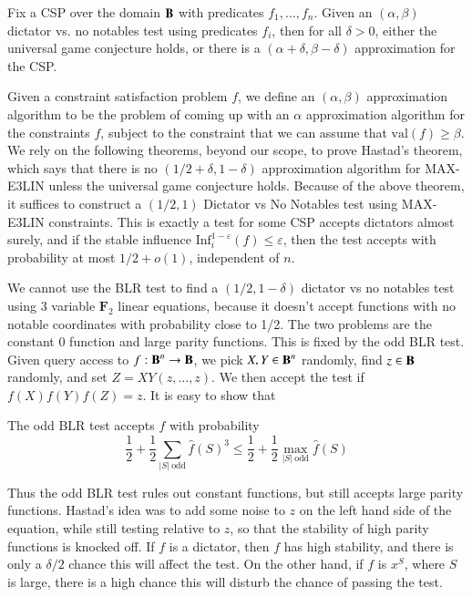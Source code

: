 \begin{theorem}
    Fix a CSP over the domain $\operatorname{\mathbf{B}}$ with predicates $f_1, \dots, f_n$. Given an $(\alpha, \beta)$ dictator vs. no notables test using predicates $f_i$, then for all $\delta > 0$, either the universal game conjecture holds, or there is a $(\alpha + \delta, \beta - \delta)$ approximation for the CSP.
\end{theorem}

Given a constraint satisfaction problem $f$, we define an $(\alpha, \beta)$ approximation algorithm to be the problem of coming up with an $\alpha$ approximation algorithm for the constraints $f$, subject to the constraint that we can assume that $\text{val}(f) \geq \beta$. We rely on the following theorems, beyond our scope, to prove Hastad's theorem, which says that there is no $(1/2 + \delta, 1 - \delta)$ approximation algorithm for MAX-E3LIN unless the universal game conjecture holds. Because of the above theorem, it suffices to construct a $(1/2,1)$ Dictator vs No Notables test using MAX-E3LIN constraints. This is exactly a test for some CSP accepts dictators almost surely, and if the stable influence $\text{Inf}_i^{1-\varepsilon}(f) \leq \varepsilon$, then the test accepts with probability at most $1/2 + o(1)$, independent of $n$.

We cannot use the BLR test to find a $(1/2, 1 - \delta)$ dictator vs no notables test using 3 variable $\mathbf{F}_2$ linear equations, because  it doesn't accept functions with no notable coordinates with probability close to 1/2. The two problems are the constant 0 function and large parity functions. This is fixed by the odd BLR test. Given query access to $f: \operatorname{\mathbf{B}}^n \to \operatorname{\mathbf{B}}$, we pick $X,Y \in \operatorname{\mathbf{B}}^n$ randomly, find $z \in \operatorname{\mathbf{B}}$ randomly, and set $Z = XY(z,\dots,z)$. We then accept the test if $f(X) f(Y) f(Z) = z$. It is easy to show that

\begin{theorem}
    The odd BLR test accepts $f$ with probability
    \[ \frac{1}{2} + \frac{1}{2} \sum_{|S|\ \text{odd}} \widehat{f}(S)^3 \leq \frac{1}{2} + \frac{1}{2} \max_{|S|\ \text{odd}} \widehat{f}(S) \]
\end{theorem}
%
Thus the odd BLR test rules out constant functions, but still accepts large parity functions. Hastad's idea was to add some noise to $z$ on the left hand side of the equation, while still testing relative to $z$, so that the stability of high parity functions is knocked off. If $f$ is a dictator, then $f$ has high stability, and there is only a $\delta/2$ chance this will affect the test. On the other hand, if $f$ is $x^S$, where $S$ is large, there is a high chance this will disturb the chance of passing the test.

